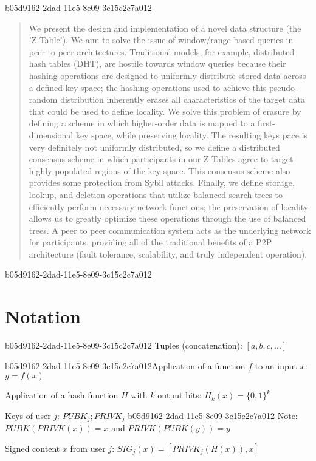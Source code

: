 \documentclass[12pt]{article}
\begin{document}
b05d9162-2dad-11e5-8e09-3c15c2c7a012\maketitle

\begin{abstract}
We present the design and implementation of a novel data structure (the 'Z-Table'). We aim to solve the issue of window/range-based queries in peer to peer architectures. Traditional models, for example,  distributed hash tables (DHT), are hostile towards window queries because their hashing operations are designed to uniformly distribute stored data across a defined key space; the hashing operations used to achieve this pseudo-random distribution inherently erases all characteristics of the target data that could be used to define locality. We solve this problem of erasure by defining a scheme in which higher-order data is mapped to a first-dimensional key space, while preserving locality. The resulting keys pace is very definitely not uniformly distributed, so we define a distributed consensus scheme in which participants in our Z-Tables agree to target highly populated regions of the key space. This consensus scheme also provides some protection from Sybil attacks. Finally, we define storage, lookup, and deletion operations that utilize balanced search trees to efficiently perform necessary network functions; the preservation of locality allows us to greatly optimize these operations through the use of balanced trees. A peer to peer communication system acts as the underlying network for participants, providing all of the traditional benefits of a P2P architecture (fault tolerance, scalability, and truly independent operation).
\end{abstract}
b05d9162-2dad-11e5-8e09-3c15c2c7a012
\section{Notation}
b05d9162-2dad-11e5-8e09-3c15c2c7a012
Tuples (concatenation): $[a,b,c,...]$

b05d9162-2dad-11e5-8e09-3c15c2c7a012Application of a function $f$ to an input $x$: $y=f(x)$

Application of a hash function $H$ with $k$ output bits: $H_{k}(x) = \{0,1\}^k$

Keys of user $j$: $ PUBK_j; PRIVK_j $
b05d9162-2dad-11e5-8e09-3c15c2c7a012
Note: $PUBK(PRIVK(x)) = x$ and $PRIVK(PUBK(y)) = y$~

Signed content $x$ from user $j$: $SIG_j(x) = \left[ PRIVK_j( H(x) ), x \right]$
\end{document}
